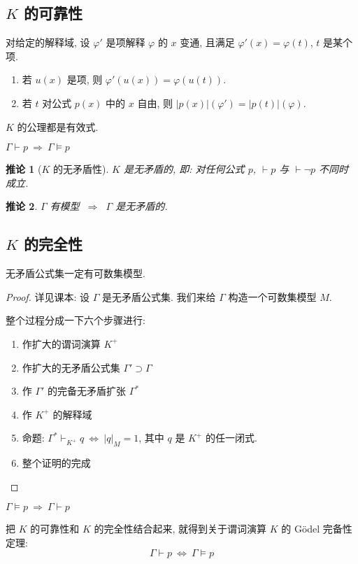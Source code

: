 \documentclass[
    color=black,
    device=normal,
    lang=cn
]{elegantnote}
\newtheorem{deduction}{推论}[section]
\begin{document}
\subsection{\texorpdfstring{$K$}{K} 的可靠性}
\begin{lemma}
    对给定的解释域, 设 $\varphi'$ 是项解释 $\varphi$ 的 $x$ 变通, 且满足 $\varphi'(x)=\varphi(t)$, $t$ 是某个项.
    \begin{enumerate}[label = $\arabic*^\circ$]
        \item 若 $u(x)$ 是项, 则 $\varphi'(u(x)) = \varphi(u(t))$.
        \item 若 $t$ 对公式 $p(x)$ 中的 $x$ 自由, 则 $\lvert p(x)\rvert(\varphi')=\lvert p(t)\rvert(\varphi)$.
    \end{enumerate}
\end{lemma}
\begin{lemma}
    $K$ 的公理都是有效式.
\end{lemma}
\begin{theorem}[$K$ 的可靠性]
    $\Gamma\vdash p\ \Rightarrow\ \Gamma\vDash p$
\end{theorem}
\begin{deduction}[$K$ 的无矛盾性]
    $K$ 是无矛盾的, 即: 对任何公式 $p$, $\vdash p$ 与 $\vdash\lnot p$ 不同时成立.
\end{deduction}
\begin{deduction}
    $\Gamma$ 有模型 $\ \Rightarrow\ $ $\Gamma$ 是无矛盾的.
\end{deduction}

\subsection{\texorpdfstring{$K$}{K} 的完全性}
\begin{definition}
    无矛盾公式集一定有可数集模型.
\end{definition}
\begin{proof}
    详见课本: 设 $\Gamma$ 是无矛盾公式集. 我们来给 $\Gamma$ 构造一个可数集模型 $M$.

    整个过程分成一下六个步骤进行:
    \begin{enumerate}[1.]
        \item 作扩大的谓词演算 $K^+$
        \item 作扩大的无矛盾公式集 $\Gamma'\supset \Gamma$
        \item 作 $\Gamma'$ 的完备无矛盾扩张 $\Gamma^*$
        \item 作 $K^+$ 的解释域
        \item 命题: $\Gamma^*\vdash_{K^+}q\ \Leftrightarrow\ \lvert q\rvert_M = 1$, 其中 $q$ 是 $K^+$ 的任一闭式.
        \item 整个证明的完成
    \end{enumerate}
\end{proof}
\begin{theorem}[$K$ 的完全性]
    $\Gamma\vDash p\ \Rightarrow\ \Gamma\vdash p$
\end{theorem}
把 $K$ 的可靠性和 $K$ 的完全性结合起来, 就得到关于谓词演算 $K$ 的 Gödel 完备性定理:
$$
    \Gamma\vdash p\ \Leftrightarrow\ \Gamma\vDash p
$$
\end{document}
